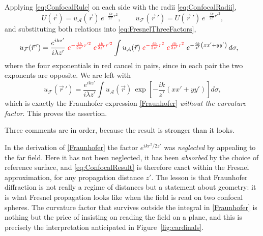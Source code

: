 		Applying \eqref{eq:ConfocalRule} on each side with the radii \eqref{eq:ConfocalRadii},
		\begin{equation}\label{eq:ConfocalReferring}
			U(\vec{r}) = u_{\mathcal{A}}(\vec{r})\,e^{-\frac{ik}{2z'}r^{2}}, \qquad
			u_{\mathcal{F}}(\vec{r}\,') = U(\vec{r}\,')\,e^{-\frac{ik}{2z'}r'^{2}} ,
		\end{equation}
		and substituting both relations into \eqref{eq:FresnelThreeFactors},
		\begin{align*}
			& u_{\mathcal{F}}(\vec{r}\,') = \dfrac{e^{ikz'}}{i\lambda z'}\;
			{\color{red}e^{-\frac{ik}{2z'}r'^{2}}}\;{\color{red}e^{\frac{ik}{2z'}r'^{2}}}
			\int u_{\mathcal{A}}(\vec{r})\;
			{\color{red}e^{-\frac{ik}{2z'}r^{2}}}\;{\color{red}e^{\frac{ik}{2z'}r^{2}}}\;
			e^{-\frac{ik}{z'}\left(xx'+yy'\right)}\,d\sigma ,
		\end{align*}
		where the four exponentials in red cancel in pairs, since in each pair the two exponents are opposite. We are left with
		\begin{equation}\label{eq:ConfocalResult}
			\boxed{\;u_{\mathcal{F}}(\vec{r}\,') = \dfrac{e^{ikz'}}{i\lambda z'}\int u_{\mathcal{A}}(\vec{r})\,
			\exp\left[-\dfrac{ik}{z'}\left(xx'+yy'\right)\right]d\sigma ,\;}
		\end{equation}
		which is exactly the Fraunhofer expression \eqref{Fraunhofer} \textit{without the curvature factor}. This proves the assertion.

		Three comments are in order, because the result is stronger than it looks.

		In the derivation of \eqref{Fraunhofer} the factor $e^{ikr^{2}/2z'}$ was \textit{neglected} by appealing to the far field. Here it has not been neglected, it has been \textit{absorbed} by the choice of reference surface, and \eqref{eq:ConfocalResult} is therefore exact within the Fresnel approximation, for any propagation distance $z'$. The lesson is that Fraunhofer diffraction is not really a regime of distances but a statement about geometry: it is what Fresnel propagation looks like when the field is read on two confocal spheres. The curvature factor that survives outside the integral in \eqref{Fraunhofer} is nothing but the price of insisting on reading the field on a plane, and this is precisely the interpretation anticipated in Figure~\ref{fig:cardinals}.

